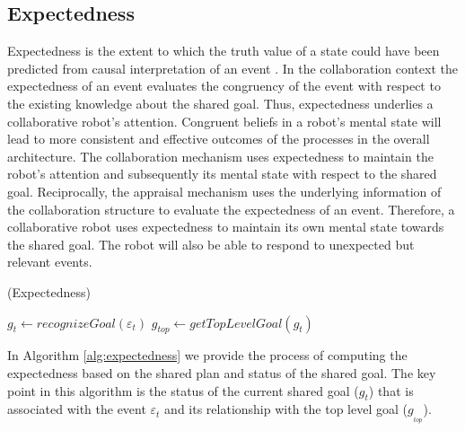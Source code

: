 \documentclass{article}
\begin{document}
\subsection{Expectedness}

Expectedness is the extent to which the truth value of a state could have been
predicted from causal interpretation of an event
\cite{marsella:ema-process-model}. In the collaboration context the expectedness
of an event evaluates the congruency of the event with respect to the existing
knowledge about the shared goal. Thus, expectedness underlies a collaborative
robot's attention. Congruent beliefs in a robot's mental state will lead to more
consistent and effective outcomes of the processes in the overall architecture.
The collaboration mechanism uses expectedness to maintain the robot's attention
and subsequently its mental state with respect to the shared goal. Reciprocally,
the appraisal mechanism uses the underlying information of the collaboration
structure to evaluate the expectedness of an event. Therefore, a collaborative
robot uses expectedness to maintain its own mental state towards the shared
goal. The robot will also be able to respond to unexpected but relevant events.

\begin{algorithm}
	\caption{(Expectedness)}
	\label{alg:expectedness}
	\begin{algorithmic}[1]
			\Statex
			\State $\mathit{g}_{t} \gets \textit{recognizeGoal}{(\varepsilon_t)}$
			\State $\mathit{g}_{top} \gets \textit{getTopLevelGoal}{(\mathit{g}_{t})}$
			\Statex
				\State {}
				\Else
					\State {}
				\EndIf
			\Else
					\State {}
				\Else
					\State {}
				\EndIf
			\EndIf
		\EndFunction
	\end{algorithmic}
\end{algorithm}

In Algorithm \ref{alg:expectedness} we provide the process of computing the
expectedness based on the shared plan and status of the shared goal. The key
point in this algorithm is the status of the current shared goal
($\mathit{g}_{t}$) that is associated with the event $\varepsilon_t$ and its
relationship with the top level goal ($\mathit{g}_{_{top}}$).
\end{document}
